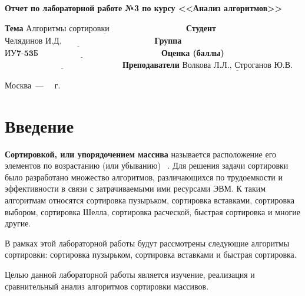 \documentclass[12pt]{report}
\begin{document}
\begin{titlepage}
	
	\begin{center}
		\Large\textbf{Отчет по лабораторной работе №3 по курсу <<Анализ алгоритмов>>}
	\end{center}
	
	\noindent\textbf{Тема} $\underline{\textbf{Алгоритмы сортировки~~~~~~~~~~~~~~~~~~~~~~~~~~~}}$\newline\newline\newline
	\noindent\textbf{Студент} $\underline{\textbf{Челядинов И.Д.~~~~~~~~~~~~~~~~~~~~~~~~~~~~~~~~~}}$\newline\newline
	\noindent\textbf{Группа} $\underline{\textbf{ИУ7-53Б~~~~~~~~~~~~~~~~~~~~~~~~~~~~~~~~~~~~~~~~~~~~}}$\newline\newline
	\noindent\textbf{Оценка (баллы)} $\underline{\textbf{~~~~~~~~~~~~~~~~~~~~~~~~~~~~~~~~~~~~~~~~~~}}$\newline\newline
	\noindent\textbf{Преподаватели} $\underline{\textbf{Волкова Л.Л., Строганов Ю.В.}}$\newline
	
	\begin{center}
		\vfill
		Москва~---~\the\year
		~г.
	\end{center}
 \restoregeometry
\end{titlepage}

\setcounter{page}{2}
\tableofcontents

\newpage
\chapter*{Введение}

\textbf{Сортировкой, или упорядочением массива} называется расположение его элементов по возрастанию (или убыванию) ~\cite{one}. Для решения задачи сортировки было разработано множество алгоритмов, различающихся по трудоемкости и эффективности в связи с затрачиваемыми ими ресурсами ЭВМ. К таким алгоритмам относятся сортировка пузырьком, сортировка вставками, сортировка выбором, сортировка Шелла, сортировка расческой, быстрая сортировка и многие другие.

В рамках этой лабораторной работы будут рассмотрены следующие алгоритмы сортировки: сортировка пузырьком,  сортировка вставками и быстрая сортировка.

Целью данной лабораторной работы является изучение, реализация и сравнительный анализ алгоритмов сортировки массивов. 
\end{document}

